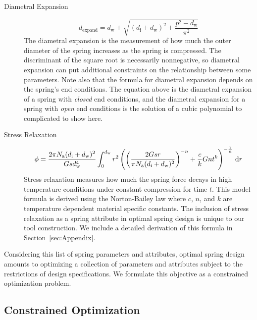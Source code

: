 \documentclass[10pt]{article}
\begin{document}
\begin{description}
			\item[Diametral Expansion]\begin{equation} d_{\text{expand}} = d_{\text{w}} + \sqrt{(d_{\text{i}} + d_{\text{w}})^{2} + \frac{p^{2} - d_{\text{w}}}{\pi^{2}}}
			\end{equation}
				The diametral expansion is the measurement of how much the outer diameter of the spring increases as the spring is compressed. The discriminant of the square root is necessarily nonnegative, so diametral expansion can put additional constraints on the relationship between some parameters. Note also that the formula for diametral expansion depends on the spring's end conditions. The equation above is the diametral expansion of a spring with \textit{closed} end conditions, and the diametral expansion for a spring with \textit{open} end conditions is the solution of a cubic polynomial to complicated to show here.
						
			\item[Stress Relaxation]\begin{equation} \phi = \frac{2\pi N_{\text{a}} (d_{\text{i}}+d_{\text{w}})^2}{Gsd_{\text{w}}^4}\int_0^{d_\text{w}} r^2 \left(\left(\frac{2Gsr}{\pi N_{\text{a}} (d_{\text{i}}+d_{\text{w}})^2}\right)^{-n} + {c\over k} Gnt^k \right)^{-{1\over n}} \,\mathrm{d} r \end{equation}
				Stress relaxation measures how much the spring force decays in high temperature conditions under constant compression for time $t$. This model formula is derived using the Norton-Bailey law where $c$, $n$, and $k$ are temperature dependent material specific constants. The inclusion of stress relaxation as a spring attribute in optimal spring design is unique to our tool construction. We include a detailed derivation of this formula in Section~\ref{sec:Appendix}.
						
			\end{description}
			
Considering this list of spring parameters and attributes, optimal spring design amounts to optimizing a collection of parameters and attributes subject to the restrictions of design specifications. We formulate this objective as a constrained optimization problem.

\subsection{Constrained Optimization}
\label{sec:Constrained_Optimization}
\end{document}
